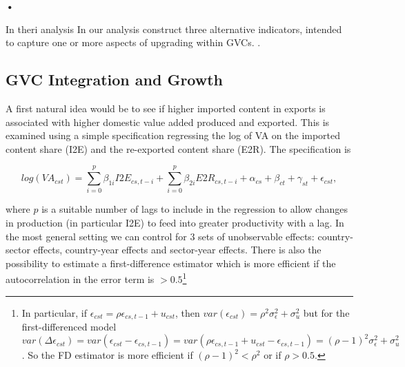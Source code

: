 \textbf{\textbf{•}}\documentclass[a4paper]{article}
\begin{document}
In theri analysis In our analysis \citet{foster2015global} construct three alternative indicators, intended to capture one or more aspects of upgrading within GVCs. 
. 




\subsection{GVC Integration and  Growth}

A first natural idea would be to see if higher imported content in exports is associated with higher domestic value added produced and exported. This is examined using a simple specification regressing the log of VA on the imported content share (I2E) and the re-exported content share (E2R). The specification is

\begin{equation} \label{eq:GROWTH_HDFE}
log(VA_{cst}) = \sum_{i=0}^p \beta_{1i} I2E_{cs,t-i} + \sum_{i = 0}^p \beta_{2i} E2R_{cs,t-i}  + \alpha_{cs} + \beta_{ct} +\gamma_{st} + \epsilon_{cst},
\end{equation}

where $p$ is a suitable number of lags to include in the regression to allow changes in production (in particular I2E) to feed into greater productivity with a lag. In the most general setting we can control for 3 sets of unobservable effects: country-sector effects, country-year effects and sector-year effects. There is also the possibility to estimate a first-difference estimator which is more efficient if the autocorrelation in the error term is $> 0.5$\footnote{In particular, if $\epsilon_{cst} = \rho \epsilon_{cs,t-1} + u_{cst}$, then $var(\epsilon_{cst}) = \rho^2 \sigma^2_\epsilon + \sigma^2_u$ but for the first-differenced model $var(\Delta \epsilon_{cst}) = var(\epsilon_{cst} - \epsilon_{cs,t-1}) = var(\rho \epsilon_{cs,t-1} + u_{cst} - \epsilon_{cs,t-1}) = (\rho-1)^2 \sigma^2_\epsilon + \sigma^2_u$. So the FD estimator is more efficient if $(\rho-1)^2<\rho^2$ or if $\rho > 0.5$. } 
\end{document}
